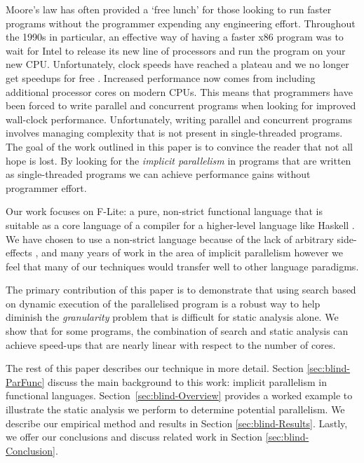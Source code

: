 Moore's law has often provided a `free lunch' for those looking to run faster
programs without the programmer expending any engineering effort. Throughout
the 1990s in particular, an effective way of having a faster x86 program was to
wait for Intel\texttrademark{} to release its new line of processors and run the
program on your new CPU. Unfortunately, clock speeds have reached a plateau and
we no longer get speedups for free \citep{sutter2005free}. Increased performance
now comes from including additional processor cores on modern CPUs.  This means
that programmers have been forced to write parallel and concurrent programs
when looking for improved wall-clock performance. Unfortunately, writing
parallel and concurrent programs involves managing complexity that is not present in
single-threaded programs. The goal of the work outlined in this paper is to
convince the reader that not all hope is lost. By looking for the
\emph{implicit parallelism} in programs that are written as single-threaded
programs we can achieve performance gains without programmer effort.

Our work focuses on F-Lite: a pure, non-strict functional language that is
suitable as a core language of a compiler for a higher-level language like
Haskell \citep{naylor2010reduceron}. We have chosen to use a non-strict language
because of the lack of arbitrary side-effects \citep{whyFPmatters}, and many
years of work in the area of implicit parallelism \citep{hogen1992automatic,
PFPAnIntro, jones1993implicit} however we feel that many of our techniques
would transfer well to other language paradigms.


The primary contribution of this paper is to demonstrate that using search based on dynamic execution of the parallelised program
is a robust way to help diminish the \emph{granularity} problem that is
difficult for static analysis alone.  We show that for some programs, the combination of search and static analysis can achieve  speed-ups that are nearly linear with respect to the number of cores.



The rest of this paper describes our technique in more detail. Section \ref{sec:blind-ParFunc} discuss the main background to this work: implicit parallelism in functional languages. Section~\ref{sec:blind-Overview} provides a worked example to illustrate the static analysis we perform to determine potential parallelism.  We describe our empirical method and results in Section \ref{sec:blind-Results}. Lastly, we offer our conclusions and discuss related work in Section \ref{sec:blind-Conclusion}.

